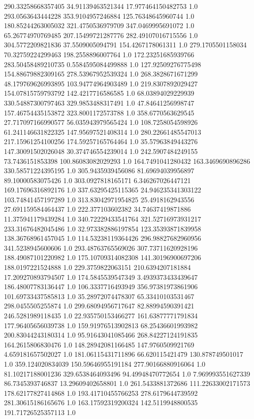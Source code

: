 290.33258668357405	34.91139463521344	17.977464150482753	1.0
293.0563643444228	353.9104957246884	125.76348645960744	1.0
180.85244263005032	321.4750536979709	347.0469995691072	1.0
65.26774970769485	207.15499721287776	282.49107016715556	1.0
304.5772209821836	37.5509005094791	154.4267178061311	1.0
279.1705501158034	70.32759224299463	198.2558896007764	1.0
172.23251685939766	283.50458489210735	0.5584595084499888	1.0
127.92509276775498	154.88679882309165	278.53967952539324	1.0
268.3828671671299	48.179769626993895	103.94774964903489	1.0
219.8307892029427	154.07815759793792	142.4217716586585	1.0
68.03894029229939	330.54887300797463	329.9853488317491	1.0
47.84641256998747	157.46754435153872	323.8001172573788	1.0
358.6770563629545	27.717097166990577	56.035943979565424	1.0
108.7258054598926	61.241146631822325	147.95697521408314	1.0
280.22661485547013	217.15961254100256	174.59257165764464	1.0
35.57963849443276	147.30091502026048	30.374746554239014	1.0
242.5907484249155	73.7436151853398	100.86083082029293	1.0
164.7491041280432	163.3469690896286	330.58571224395195	1.0
305.9435939456086	81.69694039956897	89.10000583075426	1.0
303.0927818165171	6.346267026447121	169.17696316892176	1.0
337.63295425115365	24.946235341303122	103.74841457197289	1.0
313.83042971954825	25.4918162943556	27.691159584464437	1.0
222.377103602382	34.74637419871886	11.375941179439284	1.0
340.72229433541764	321.52716973931217	233.31676482045486	1.0
32.973382886197854	123.35393871839958	138.36768961457045	1.0
114.53238119364426	296.98827682960956	341.5238945600606	1.0
293.48763765569026	307.73711620928196	188.49087101220982	1.0
175.10709314082308	141.30196900697206	188.0197221524888	1.0
229.3759822063151	210.6394207181884	17.209270893794507	1.0
174.5845539547349	3.4939373433439647	186.48007783136447	1.0
106.3337716493949	356.97381973861906	101.69733437585813	1.0
35.28972074478307	65.33410103531467	298.0455505255874	1.0
299.68094956717647	82.88994590391421	246.5281989118435	1.0
22.935750153466277	161.63877771791834	177.96405656039738	1.0
159.91976513902813	68.25436601993982	200.83044243180314	1.0
95.91643041085466	268.84227124191835	164.2615806830476	1.0
148.28942081166485	147.9760509921769	4.659181657502027	1.0
181.06115431711896	66.620115421479	130.878749501017	1.0
359.124020834039	150.59646955191184	277.90166880916064	1.0
81.10217188001236	329.6538464093496	94.49948470772654	1.0
7.969993551627339	86.7345393746837	13.29609402658801	1.0
261.5433881372686	111.22633002171573	178.62177827414868	1.0
193.41710455766253	278.6179644739592	281.30615186165676	1.0
163.17592319200324	142.5119948800535	191.71726525357113	1.0
